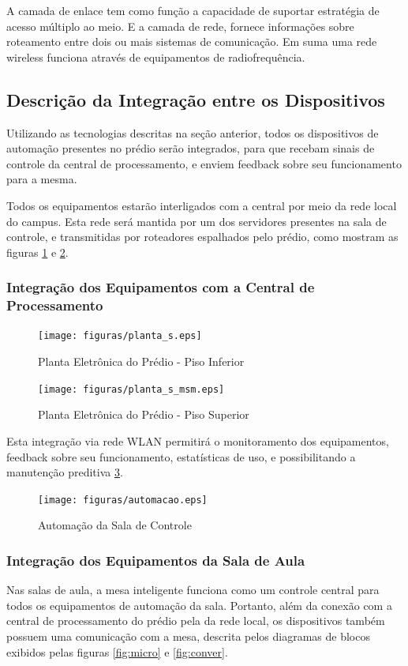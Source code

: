 A camada de enlace tem como função a capacidade de suportar estratégia de acesso múltiplo ao meio. E a camada de rede, fornece informações sobre roteamento entre dois ou mais sistemas de comunicação. Em suma uma rede wireless funciona através de equipamentos de radiofrequência.

\subsection{Descrição da Integração entre os Dispositivos}
Utilizando as tecnologias descritas na seção anterior, todos os dispositivos de
automação presentes no prédio serão integrados, para que recebam sinais de
controle da central de processamento, e enviem feedback sobre seu funcionamento
para a mesma.

Todos os equipamentos estarão interligados com a central por meio da rede local
do campus. Esta rede será mantida por um dos servidores presentes na sala de
controle, e transmitidas por roteadores espalhados pelo prédio, como mostram as
figuras \ref{fig:plant_s} e \ref{fig:plant_s_msm}.

\subsubsection{Integração dos Equipamentos com a Central de Processamento}
\begin{figure}[!h]
  \centering
  \texttt{[image: figuras/planta\_s.eps]}
  \caption{Planta Eletrônica do Prédio - Piso Inferior\label{fig:plant_s}}
\end{figure}

\begin{figure}[!h]
  \centering
  \texttt{[image: figuras/planta\_s\_msm.eps]}
  \caption{Planta Eletrônica do Prédio - Piso Superior\label{fig:plant_s_msm}}
\end{figure}

Esta integração via rede WLAN permitirá o monitoramento dos equipamentos,
feedback sobre seu funcionamento, estatísticas de uso, e possibilitando a
manutenção preditiva \ref{fig:auto}.


\begin{figure}[!h]
  \centering
  \texttt{[image: figuras/automacao.eps]}
  \caption{Automação da Sala de Controle\label{fig:auto}}
\end{figure}

\subsubsection{Integração dos Equipamentos da Sala de Aula} Nas salas de aula, a
mesa inteligente funciona como um controle central para todos os equipamentos de
automação da sala. Portanto, além da conexão com a central de processamento do
prédio pela da rede local, os dispositivos também possuem uma comunicação com a
mesa, descrita pelos diagramas de blocos exibidos pelas figuras \ref{fig:micro} e \ref{fig:conver}.


